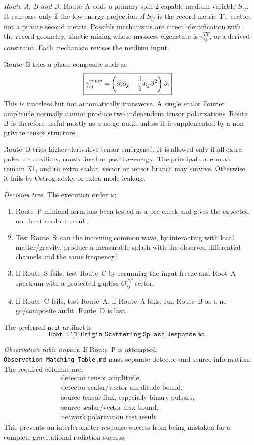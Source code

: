 \documentclass[11pt]{article}
\begin{document}
\medskip\noindent\textit{Route A, B and D.}
Route~A adds a primary spin-2-capable medium variable \(S_{ij}\).  It can pass
only if the low-energy projection of \(S_{ij}\) is the record metric TT sector,
not a private second metric.  Possible mechanisms are direct identification
with the record geometry, kinetic mixing whose massless eigenstate is
\(\gamma^{TT}_{ij}\), or a derived constraint.  Each mechanism revises the
medium input.

Route~B tries a phase composite such as
\[
\boxed{
\gamma^{\rm comp}_{ij}=
\left(\partial_i\partial_j-\frac13\delta_{ij}\partial^2\right)\vartheta.
}
\]
This is traceless but not automatically transverse.  A single scalar Fourier
amplitude normally cannot produce two independent tensor polarizations.  Route
B is therefore useful mostly as a no-go audit unless it is supplemented by a
non-private tensor structure.

Route~D tries higher-derivative tensor emergence.  It is allowed only if all
extra poles are auxiliary, constrained or positive-energy.  The principal cone
must remain K1, and no extra scalar, vector or tensor branch may survive.
Otherwise it fails by Ostrogradsky or extra-mode leakage.

\medskip\noindent\textit{Decision tree.}
The execution order is:
\begin{enumerate}
\item Route~P minimal form has been tested as a pre-check and gives the
  expected no-direct-readout result.
\item Test Route~S: can the incoming common wave, by interacting with local
  matter/gravity, produce a measurable splash with the observed differential
  channels and the same frequency?
\item If Route~S fails, test Route~C by rerunning the input freeze and Root~A
  spectrum with a protected gapless \(Q^{TT}_{ij}\) sector.
\item If Route~C fails, test Route~A.  If Route~A fails, run Route~B as a
  no-go/composite audit.  Route~D is last.
\end{enumerate}
The preferred next artifact is
\[
\boxed{\texttt{Root\_B\_TT\_Origin\_Scattering\_Splash\_Response.md}.}
\]

\medskip\noindent\textit{Observation-table impact.}
If Route~P is attempted, \texttt{Observation\_Matching\_Table.md} must
separate detector and source information.  The required columns are:
\[
\boxed{
\begin{array}{l}
\text{detector tensor amplitude},\\
\text{detector scalar/vector amplitude bound},\\
\text{source tensor flux, especially binary pulsars},\\
\text{source scalar/vector flux bound},\\
\text{network polarization test result}.
\end{array}}
\]
This prevents an interferometer-response success from being mistaken for a
complete gravitational-radiation success.
\end{document}
